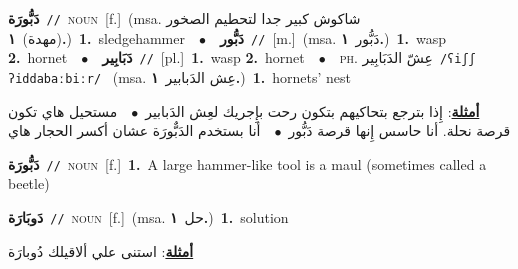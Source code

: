 \documentclass[10pt,a4paper,twoside]{article} %
\begin{document}
\begin{multicols}{2}
{{{\setlength\topsep{0pt}\textbf{\foreignlanguage{arabic}{دَبُّورَة}}\ {\color{gray}\texttt{//}\color{black}}\ \textsc{noun}\ [f.]\ \color{gray}(msa. \foreignlanguage{arabic}{شاكوش كبير جدا لتحطيم الصخور (مهدة)}~\foreignlanguage{arabic}{\textbf{١.}})\color{black}\ \textbf{1.}~sledgehammer\ \ $\bullet$\ \ \setlength\topsep{0pt}\textbf{\foreignlanguage{arabic}{دَبُّور}}\ {\color{gray}\texttt{//}\color{black}}\ [m.]\ \color{gray}(msa. \foreignlanguage{arabic}{دَبُّور}~\foreignlanguage{arabic}{\textbf{١.}})\color{black}\ \textbf{1.}~wasp  \textbf{2.}~hornet\ \ $\bullet$\ \ \setlength\topsep{0pt}\textbf{\foreignlanguage{arabic}{دَبَابِير}}\ {\color{gray}\texttt{//}\color{black}}\ [pl.]\ \textbf{1.}~wasp  \textbf{2.}~hornet\ \ $\bullet$\ \ \textsc{ph.} \color{gray} \foreignlanguage{arabic}{عِشّ الدَبَابِير}\color{black}\ {\color{gray}\texttt{/{\sffamily ʕiʃʃ ʔiddabaːbiːr}/}\color{black}}\ \color{gray} (msa. \foreignlanguage{arabic}{عِش الدَبابير}~\foreignlanguage{arabic}{\textbf{١.}})\color{black}\ \textbf{1.}~hornets' nest\  \begin{flushright}\color{gray}\foreignlanguage{arabic}{\textbf{\underline{\foreignlanguage{arabic}{أمثلة}}}: إِذا بترجع بتحاكيهم بتكون رحت بإِجريك لعِش الدَبابير\ $\bullet$\ \  مستحيل هاي تكون قرصة نحلة. أنا حاسس إِنها قرصة دَبُّور\ $\bullet$\ \  أنا بستخدم الدَبٌّورَة عشان أكسر الحجار هاي}\end{flushright}\color{black}} \vspace{2mm}

{\setlength\topsep{0pt}\textbf{\foreignlanguage{arabic}{دَبُّورَة}}\ {\color{gray}\texttt{//}\color{black}}\ \textsc{noun}\ [f.]\ \textbf{1.}~A large hammer-like tool is a maul (sometimes called a beetle)\ 

{\setlength\topsep{0pt}\textbf{\foreignlanguage{arabic}{دَوبَارَة}}\ {\color{gray}\texttt{//}\color{black}}\ \textsc{noun}\ [f.]\ \color{gray}(msa. \foreignlanguage{arabic}{حل}~\foreignlanguage{arabic}{\textbf{١.}})\color{black}\ \textbf{1.}~solution\  \begin{flushright}\color{gray}\foreignlanguage{arabic}{\textbf{\underline{\foreignlanguage{arabic}{أمثلة}}}: استنى علي ألاقيلك دُوبارَة}\end{flushright}\color{black}} \vspace{2mm}

}}}
\end{multicols}
\end{document}
